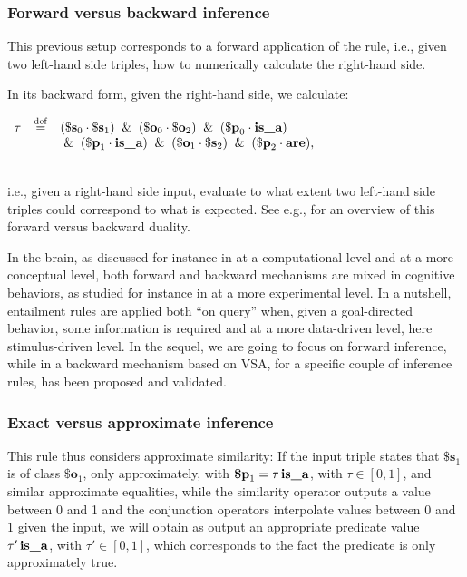 \documentclass[sn-mathphys]{sn-jnl}
\newcommand{\defq}{\stackrel {\rm def}{=}}
\newcommand{\eqline}[1]{~\vspace{0.1cm}\\\centerline{$#1$}\vspace{0.1cm}\\}
\begin{document}
\subsubsection{Forward versus backward inference}

This previous setup corresponds to a forward application of the rule, i.e., given two left-hand side triples, how to numerically calculate the right-hand side.

In its backward form, given the right-hand side, we calculate:
\eqline{\begin{array}{rcl}\tau &\defq&  (\mathbf{\$s}_0 \cdot \mathbf{\$s}_1) \And (\mathbf{\$o}_0 \cdot \mathbf{\$o}_2) \And (\mathbf{\$p}_0 \cdot \texttt{\bf is\_a}) \\&& \And (\mathbf{\$p}_1 \cdot \texttt{\bf is\_a}) \And (\mathbf{\$o}_1 \cdot \mathbf{\$s}_2) \And (\mathbf{\$p}_2 \cdot \texttt{\bf are}),\end{array}}
i.e., given a right-hand side input, evaluate to what extent two left-hand side triples could correspond to what is expected. See e.g., \cite{kapoor_comparative_2016} for an overview of this forward versus backward duality.

In the brain, as discussed for instance in \cite{oreilly_goal-driven_2014} at a computational level and \cite{friston_learning_2003} at a more conceptual level, both forward and backward mechanisms are mixed in cognitive behaviors, as studied for instance in \cite{amidu_protocol_2019} at a more experimental level. In a nutshell, entailment rules are applied both ``on query'' when, given a goal-directed behavior, some information is required and at a more data-driven level, here stimulus-driven level. In the sequel, we are going to focus on forward inference, while in \cite{mercier_ontology_2021} a backward mechanism based on VSA, for a specific couple of inference rules, has been proposed and validated.

\subsubsection{Exact versus approximate inference}

This rule thus considers approximate similarity: If the input triple states that $\textbf{\$s}_1$ is of class $\textbf{\$o}_1$, only approximately, with $\textbf{\$p}_1 = \tau \, \texttt{\bf is\_a}$, with $\tau \in [0,1]$, and similar approximate equalities, while the similarity operator outputs a value between 0 and 1 and the conjunction operators interpolate values between $0$ and $1$ given the input, we will obtain as output an appropriate predicate value $\tau' \, \texttt{\bf is\_a}$, with $\tau' \in [0,1]$, which corresponds to the fact the predicate is only approximately true.
\end{document}
